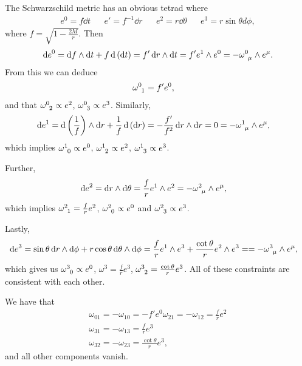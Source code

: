 \begin{example}
    The Schwarzschild metric has an obvious tetrad where
    \begin{align}
        e^{0} = f \dd{t} && e' = f^{-1} \dd{r} && e^{2} = r \dd{\theta} && e^{3} = r \sin \theta d\phi
    ,\end{align}
    where $f = \sqrt{1 - \frac{2M}{r}}$. Then
    \begin{align}
        \dd{e}^{0} = \dd{f} \wedge \dd{t} + f \dd{ \left( \dd{t} \right)} = f' \dd{r} \wedge \dd{t} = f' e^{1} \wedge e^{0} = - \tensor{\omega}{^{0}_{\mu}} \wedge e^{\mu}
    .\end{align}
    From this we can deduce
    \begin{align}
        \tensor{\omega}{^{0}_1} &= f' e^{0} 
    ,\end{align}
    and that $\tensor{\omega}{^{0}_2} \propto e^2$, $\tensor{\omega}{^{0}_3} \propto e^3$.
    Similarly,
    \begin{align}
        \dd{e}^{1} &= \dd{\left( \frac{1}{f} \right)} \wedge \dd{r} + \frac{1}{f} \dd{\left( \dd{r} \right) } = -\frac{f'}{f^2} \dd{r} \wedge \dd{r} = 0 = - \tensor{\omega}{^{1}_{\mu}} \wedge e^{\mu} 
    ,\end{align}
    which implies $\tensor{\omega}{^{1}_0} \propto e^{0}$, $\tensor{\omega}{^{1}_2} \propto e^2$, $\tensor{\omega}{^{1}_3} \propto e^3$.

    Further,
    \begin{align}
                \dd{e}^2 &= \dd{r} \wedge \dd{\theta} = \frac{f}{r} e^{1} \wedge e^{2} = - \tensor{\omega}{^{2}_\mu} \wedge e^{\mu} 
    ,\end{align}
    which implies $\tensor{\omega}{^{2}_1} = \frac{f}{r} e^2$, $\tensor{\omega}{^2_0} \propto e^{0}$ and $\tensor{\omega}{^2_3} \propto e^3$.

    Lastly,
    \begin{align}
        \dd{e}^{3} &= \sin \theta \dd{r} \wedge \dd{\phi} + r \cos \theta \dd{\theta} \wedge \dd{\phi} = \frac{f}{r} e^{1} \wedge e^{3} + \frac{\cot \theta}{r} e^{2} \wedge e^{3} = = - \tensor{\omega}{^{3}_\mu} \wedge e^{\mu} 
    ,\end{align}
    which gives us $\tensor{\omega}{^3_0} \propto e^{0}$, $\omega^3 = \frac{f}{r} e^3$, $\tensor{\omega}{^3_2} = \frac{\cot \theta}{r} e^3$.
    All of these constraints are consistent with each other.

    We have that
    \begin{align}
        \omega_{01} = - \omega_{10} =-f' e^{0}
        \omega_{21} = - \omega_{12} = \frac{f}{r} e^2 \\
        \omega_{31} = -\omega_{13} = \frac{f}{r} e^3 \\
        \omega_{32} = -\omega_{23} = \frac{\cot \theta}{r} e^3
    ,\end{align}
    and all other components vanish.
\end{example}

